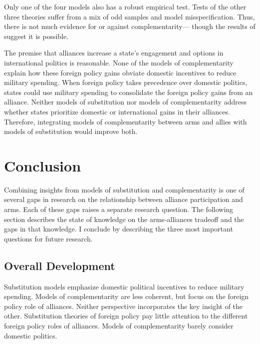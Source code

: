 \documentclass[12pt]{article}
\begin{document}
Only one of the four models also has a robust empirical test. 
Tests of the other three theories suffer from a mix of odd samples and model misspecification. 
Thus, there is not much evidence for or against complementarity--- though the results of \citet{Horowitzetal2017} suggest it is possible. 


The premise that alliances increase a state's engagement and options in international politics is reasonable. 
None of the models of complementarity explain how these foreign policy gains obviate domestic incentives to reduce military spending. 
When foreign policy takes precedence over domestic politics, states could use military spending to consolidate the foreign policy gains from an alliance. 
Neither models of substitution nor models of complementarity address whether states prioritize domestic or international gains in their alliances. 
Therefore, integrating models of complementarity between arms and allies with models of substitution would improve both. 




\section{Conclusion}


Combining insights from models of substitution and complementarity is one of several gaps in research on the relationship between alliance participation and arms. 
Each of these gaps raises a separate research question. 
The following section describes the state of knowledge on the arms-alliances tradeoff and the gaps in that knowledge. 
I conclude by describing the three most important questions for future research. 



\subsection{Overall Development}

Substitution models emphasize domestic political incentives to reduce military spending. 
Models of complementarity are less coherent, but focus on the foreign policy role of alliances. 
Neither perspective incorporates the key insight of the other.
Substitution theories of foreign policy pay little attention to the different foreign policy roles of alliances.
Models of complementarity barely consider domestic politics. 
\end{document}
